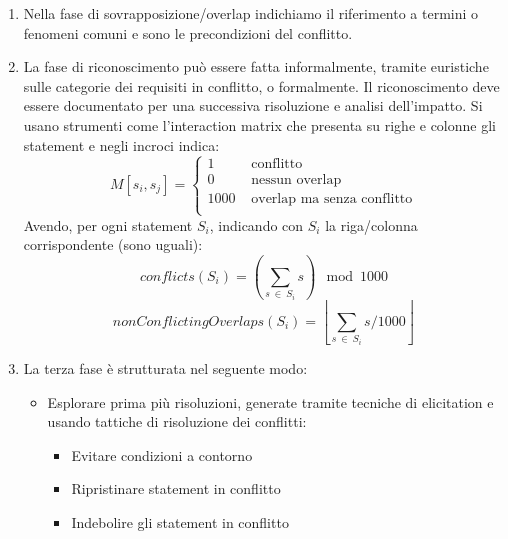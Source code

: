 \begin{enumerate}
      \item Nella fase di sovrapposizione/overlap indichiamo il riferimento a
            termini o fenomeni comuni e sono le precondizioni del conflitto.
      \item La fase di riconoscimento può essere fatta informalmente, tramite
            euristiche sulle categorie dei requisiti in conflitto, o formalmente. Il
            riconoscimento deve essere documentato per una successiva risoluzione e analisi
            dell'impatto. Si usano strumenti come l'interaction matrix che presenta su
            righe e colonne gli statement e negli incroci indica:
            \begin{equation}
                  M[s_i,s_j] = \begin{cases}
                        1&\text{ conflitto}\\
                        0&\text{ nessun overlap}\\
                        1000&\text{ overlap ma senza conflitto}\\
                  \end{cases}
            \end{equation}
            Avendo, per ogni statement $S_i$, indicando con $S_i$ la riga/colonna
            corrispondente (sono uguali):
            \begin{equation}
                  conflicts(S_i) = \left(\sum_{s \ \in \ S_i} s \right) \mod 1000
            \end{equation}
            \begin{equation}
                  nonConflictingOverlaps(S_i) = \left\lfloor \sum_{s \ \in \ S_i} s / 1000 \right\rfloor
            \end{equation}
      \item La terza fase è strutturata nel seguente modo:
            \begin{itemize}
                  \item Esplorare prima più risoluzioni, generate tramite tecniche
                        di elicitation e usando tattiche di risoluzione dei conflitti:
                        \begin{itemize}
                              \item Evitare condizioni a contorno
                              \item Ripristinare statement in conflitto
                              \item Indebolire gli statement in conflitto

\end{itemize}
\end{itemize}
\end{enumerate}
